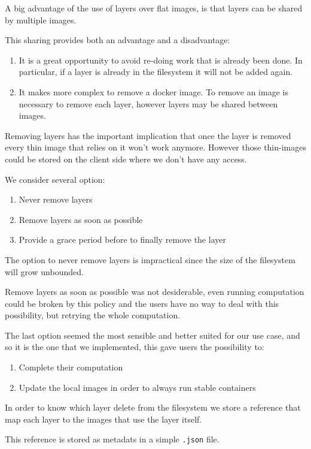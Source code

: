 A big advantage of the use of layers over flat images, is that layers can be shared by multiple images.

This sharing provides both an advantage and a disadvantage:
\begin{enumerate}
        \item It is a great opportunity to avoid re-doing work that is already been done. In particular, if a layer is already in the filesystem it will not be added again.
        \item It makes more complex to remove a docker image. To remove an image is necessary to remove each layer, however layers may be shared between images.
\end{enumerate}

Removing layers has the important implication that once the layer is removed every thin image that relies on it won’t work anymore. However those thin-images could be stored on the client side where we don’t have any access.

We consider several option:
\begin{enumerate}
\item Never remove layers
\item Remove layers as soon as possible
\item Provide a grace period before to finally remove the layer
\end{enumerate}

The option to never remove layers is impractical since the size of the filesystem will grow unbounded.

Remove layers as soon as possible was not desiderable, even running computation could be broken by this policy and the users have no way to deal with this possibility, but retrying the whole computation.

The last option seemed the most sensible and better suited for our use case, and so it is the one that we implemented, this gave users the possibility to:
\begin{enumerate}
\item Complete their computation
\item Update the local images in order to always run stable containers
\end{enumerate}

In order to know which layer delete from the filesystem we store a reference that map each layer to the images that use the layer itself.

This reference is stored as metadats in a simple \texttt{.json} file.

